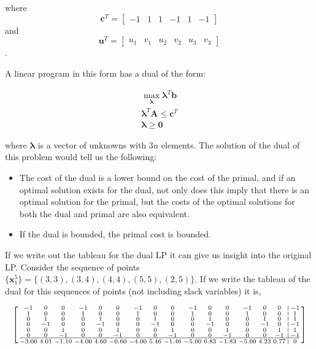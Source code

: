 \documentclass{article}
\begin{document}
\noindent where \[\mathbf{c}^T = \begin{bmatrix}-1 & 1 & 1 & -1 & 1 & -1\end{bmatrix}\] and \[\mathbf{u}^T = \begin{bmatrix}u_1 & v_1 & u_2 & v_2 & u_3 & v_3\end{bmatrix}\].

\noindent A linear program in this form has a dual of the form:

\begin{eqnarray*}
	\max_{\boldsymbol{\lambda}} \boldsymbol{\lambda}^T \mathbf{b}\\
	\boldsymbol{\lambda}^T \mathbf{A} \le \mathbf{c}^T\\
	\boldsymbol{\lambda} \ge \mathbf{0}
\end{eqnarray*}

\noindent where $\boldsymbol{\lambda}$ is a vector of unknowns with $3n$ elements.
The solution of the dual of this problem would tell us the following:

\begin{itemize}
	\item The cost of the dual is a lower bound on the cost of the primal, and if an optimal solution exists for the dual, not only does this imply that there is an optimal solution for the primal, but the costs of the optimal solutions for both the dual and primal are also equivalent.
	\item If the dual is bounded, the primal cost is bounded.
\end{itemize}

If we write out the tableau for the dual LP it can give us insight into the original LP.
Consider the sequence of points $\{\mathbf{x}^5_1\} = \{(3, 3), (3, 4), (4, 4), (5, 5), (2, 5)\}$.
If we write the tableau of the dual for this sequences of points (not including slack variables) it is,

\begin{equation*}
\left[ \begin{smallmatrix}
-1 & 0 & 0 & -1 & 0 & 0 & -1 & 0 & 0 & -1 & 0 & 0 & -1 & 0 & 0 & \vline & -1\\
1 & 0 & 0 & 1 & 0 & 0 & 1 & 0 & 0 & 1 & 0 & 0 & 1 & 0 & 0 & \vline & 1\\
0 & 1 & 0 & 0 & 1 & 0 & 0 & 1 & 0 & 0 & 1 & 0 & 0 & 1 & 0 & \vline & 1\\
0 & -1 & 0 & 0 & -1 & 0 & 0 & -1 & 0 & 0 & -1 & 0 & 0 & -1 & 0 & \vline & -1\\
0 & 0 & 1 & 0 & 0 & 1 & 0 & 0 & 1 & 0 & 0 & 1 & 0 & 0 & 1 & \vline & 1\\
0 & 0 & -1 & 0 & 0 & -1 & 0 & 0 & -1 & 0 & 0 & -1 & 0 & 0 & -1 & \vline & -1\\
\hline \\
-3.00 & 4.01 & -1.10 & -4.00 & 4.60 & -0.60 & -4.00 & 5.46 & -1.46 & -5.00 & 6.83 & -1.83 & -5.00 & 4.23 & 0.77 & \vline & 0\\
\end{smallmatrix} \right]
\end{equation*}
\end{document}
